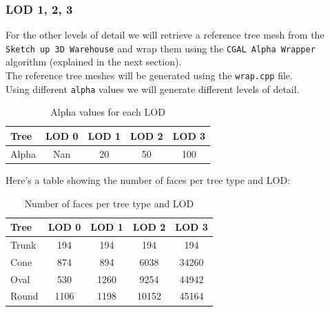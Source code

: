 \documentclass[12pt]{article}
\begin{document}
\subsubsection{LOD 1, 2, 3}
For the other levels of detail we will retrieve a reference tree mesh from the
\texttt{Sketch up 3D Warehouse}\cite{sketchup} and wrap them using the 
\texttt{CGAL Alpha Wrapper}\cite{cgal_alpha_wrapper} algorithm (explained in the 
next section). \\
The reference tree meshes will be generated using the \texttt{wrap.cpp} file. \\
Using different \texttt{alpha} values we will generate different levels of detail. \\  

\begin{table}[H]
    \centering
    \begin{tabular}{|l|c|c|c|c|}
    \hline
    Tree & LOD 0 & LOD 1 & LOD 2 & LOD 3 \\
    \hline
    Alpha & Nan & 20 & 50 & 100 \\
    \hline
    \end{tabular}
    \caption{Alpha values for each LOD}
    \label{tab:my_label}
\end{table}

Here's a table showing the number of faces per tree type and LOD:

\begin{table}[H]
    \centering
    \begin{tabular}{|l|c|c|c|c|}
    \hline
    Tree & LOD 0 & LOD 1 & LOD 2 & LOD 3 \\
    \hline
    Trunk & 194 & 194 & 194 & 194 \\
    Cone & 874 & 894 & 6038 & 34260 \\
    Oval & 530 & 1260 & 9254 & 44942 \\
    Round & 1106 & 1198 & 10152 & 45164 \\
    \hline
    \end{tabular}
    \caption{Number of faces per tree type and LOD}
    \label{tab:my_label2}
\end{table}
\end{document}
